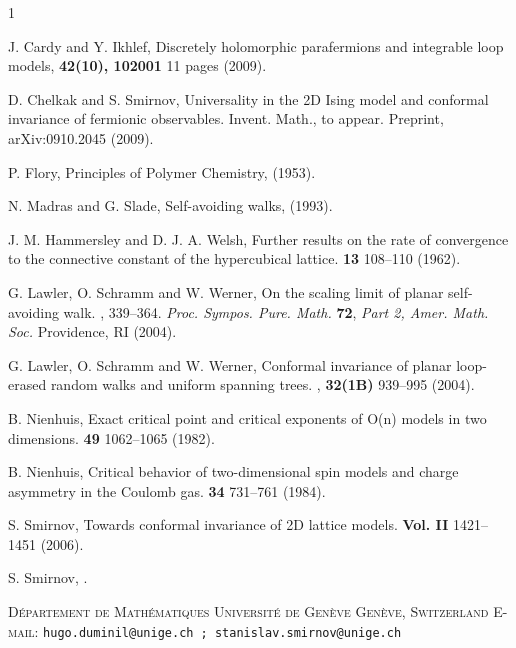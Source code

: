 \documentclass[a4paper,oneside,12pt]{article}
\begin{document}

\begin{thebibliography}{1}

J. Cardy and Y. Ikhlef,
\newblock Discretely holomorphic parafermions and integrable loop models,
 \textbf{42(10), 102001} 11 pages (2009).

D. Chelkak and S. Smirnov,
\newblock Universality in the 2{D} {I}sing model and conformal invariance of
  fermionic observables.
\newblock Invent. Math., to appear. Preprint, arXiv:0910.2045 (2009).

P. Flory,
\newblock Principles of Polymer Chemistry,
 (1953).

N. Madras and G. Slade,
\newblock Self-avoiding walks,
 (1993).

J. M. Hammersley and D. J. A. Welsh,
\newblock Further results on the rate of convergence to the connective constant of the hypercubical lattice.
 \textbf{13} 108--110 (1962).

G. Lawler, O. Schramm and W. Werner,
\newblock On the scaling limit of planar self-avoiding walk.
, 339--364. {\em Proc. Sympos. Pure. Math.} {\bf 72}, {\em Part 2, Amer. Math. Soc.} Providence, RI (2004).


G. Lawler, O. Schramm and W. Werner,
\newblock Conformal invariance of planar loop-erased random walks and uniform
  spanning trees.
, {\bf 32(1B)} 939--995 (2004).


B. Nienhuis, 
\newblock Exact critical point and critical exponents of O(n) models in two dimensions. 
 \textbf{49} 1062--1065 (1982). 

B. Nienhuis, 
\newblock Critical behavior of two-dimensional spin models and charge asymmetry in the Coulomb gas. 
 \textbf{34} 731--761 (1984). 

S. Smirnov,
\newblock Towards conformal invariance of 2D lattice models. 
 \textbf{Vol. II} 1421--1451 (2006).

S. Smirnov,
.

\end{thebibliography}
\begin{flushright}
\footnotesize\obeylines
  \textsc{D\'epartement de Math\'ematiques}
  \textsc{Universit\'e de Gen\`eve}
  \textsc{Gen\`eve, Switzerland}
  \textsc{E-mail:} \texttt{hugo.duminil@unige.ch ; stanislav.smirnov@unige.ch}
\end{flushright}
\end{document}
